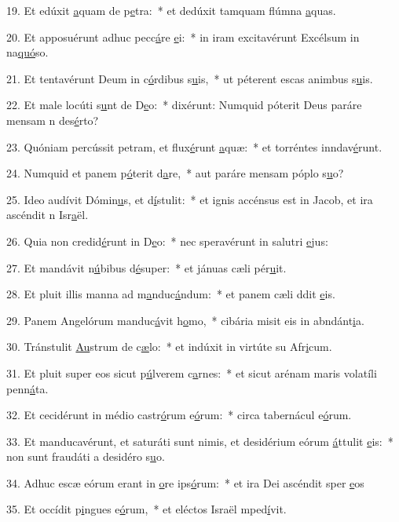 19. Et edúxit \uline{a}quam de p\uline{e}tra:~* et dedúxit tamquam flúmna \uline{a}quas.\par 
20. Et apposuérunt adhuc pecc\uline{á}re \uline{e}i:~* in iram excitavérunt Excélsum in na\uline{quó}so.\par 
21. Et tentavérunt Deum in c\uline{ó}rdibus s\uline{u}is,~* ut péterent escas animbus s\uline{u}is.\par 
22. Et male locúti s\uline{u}nt de D\uline{e}o:~* dixérunt: Numquid póterit Deus paráre mensam n des\uline{é}rto?\par 
23. Quóniam percússit petram, et flux\uline{é}runt \uline{a}quæ:~* et torréntes inndav\uline{é}runt.\par 
24. Numquid et panem p\uline{ó}terit d\uline{a}re,~* aut paráre mensam póplo s\uline{u}o?\par 
25. Ideo audívit Dómin\uline{u}s, et d\uline{í}stulit:~* et ignis accénsus est in Jacob, et ira ascéndit n Isr\uline{a}ël.\par 
26. Quia non credid\uline{é}runt in D\uline{e}o:~* nec speravérunt in salutri \uline{e}jus:\par 
27. Et mandávit n\uline{ú}bibus d\uline{é}super:~* et jánuas cæli pér\uline{u}it.\par 
28. Et pluit illis manna ad m\uline{a}nduc\uline{á}ndum:~* et panem cæli ddit \uline{e}is.\par 
29. Panem Angelórum manduc\uline{á}vit h\uline{o}mo,~* cibária misit eis in abndánt\uline{i}a.\par 
30. Tránstulit \uline{Au}strum de c\uline{æ}lo:~* et indúxit in virtúte su Afr\uline{i}cum.\par 
31. Et pluit super eos sicut p\uline{ú}lverem c\uline{a}rnes:~* et sicut arénam maris volatíli penn\uline{á}ta.\par 
32. Et cecidérunt in médio castr\uline{ó}rum e\uline{ó}rum:~* circa tabernácul e\uline{ó}rum.\par 
33. Et manducavérunt, et saturáti sunt nimis, et desidérium eórum \uline{á}ttulit \uline{e}is:~* non sunt fraudáti a desidéro s\uline{u}o.\par 
34. Adhuc escæ eórum erant in \uline{o}re ips\uline{ó}rum:~* et ira Dei ascéndit sper \uline{e}os\par 
35. Et occídit p\uline{i}ngues e\uline{ó}rum,~* et eléctos Israël mped\uline{í}vit.\par 
